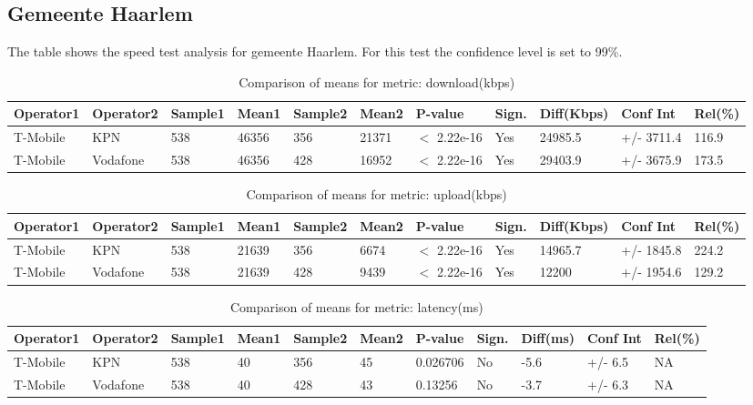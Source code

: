 \documentclass[]{article}
\begin{document}
\normalsize

\newpage

\subsection{Gemeente Haarlem}\label{gemeente-haarlem}

The table shows the speed test analysis for gemeente Haarlem. For this
test the confidence level is set to 99\%.

\begin{table}[ht]
\centering
{\footnotesize
\begin{tabular}{lllllllllll}
  \hline
Operator1 & Operator2 & Sample1 & Mean1 & Sample2 & Mean2 & P-value & Sign. & Diff(Kbps) & Conf Int & Rel(\%) \\ 
  \hline
T-Mobile & KPN & 538 & 46356 & 356 & 21371 & $<$ 2.22e-16 & Yes & 24985.5 & +/- 3711.4 & 116.9 \\ 
  T-Mobile & Vodafone & 538 & 46356 & 428 & 16952 & $<$ 2.22e-16 & Yes & 29403.9 & +/- 3675.9 & 173.5 \\ 
   \hline
\end{tabular}
}
\caption{Comparison of means for metric: download(kbps)} 
\end{table}

\begin{table}[ht]
\centering
{\footnotesize
\begin{tabular}{lllllllllll}
  \hline
Operator1 & Operator2 & Sample1 & Mean1 & Sample2 & Mean2 & P-value & Sign. & Diff(Kbps) & Conf Int & Rel(\%) \\ 
  \hline
T-Mobile & KPN & 538 & 21639 & 356 & 6674 & $<$ 2.22e-16 & Yes & 14965.7 & +/- 1845.8 & 224.2 \\ 
  T-Mobile & Vodafone & 538 & 21639 & 428 & 9439 & $<$ 2.22e-16 & Yes & 12200 & +/- 1954.6 & 129.2 \\ 
   \hline
\end{tabular}
}
\caption{Comparison of means for metric: upload(kbps)} 
\end{table}

\begin{table}[ht]
\centering
{\footnotesize
\begin{tabular}{lllllllllll}
  \hline
Operator1 & Operator2 & Sample1 & Mean1 & Sample2 & Mean2 & P-value & Sign. & Diff(ms) & Conf Int & Rel(\%) \\ 
  \hline
T-Mobile & KPN & 538 & 40 & 356 & 45 & 0.026706 & No & -5.6 & +/- 6.5 & NA \\ 
  T-Mobile & Vodafone & 538 & 40 & 428 & 43 & 0.13256 & No & -3.7 & +/- 6.3 & NA \\ 
   \hline
\end{tabular}
}
\caption{Comparison of means for metric: latency(ms)} 
\end{table}
\end{document}
